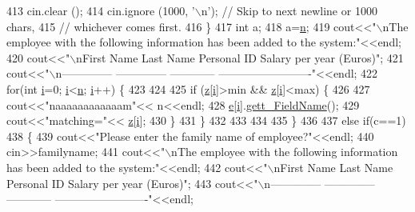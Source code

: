 \begin{DoxyCode}
413         cin.clear ();
414         cin.ignore (1000, \textcolor{charliteral}{'\(\backslash\)n'});  \textcolor{comment}{// Skip to next newline or 1000 chars,}
415         \textcolor{comment}{// whichever comes first.}
416       \}
417       \textcolor{keywordtype}{int} a;
418       a=\hyperlink{HumanResources_8cpp_a76f11d9a0a47b94f72c2d0e77fb32240}{n};
419       cout<<\textcolor{stringliteral}{"\(\backslash\)nThe employee with the following information has been added to the system:"}<<endl;
420       cout<<\textcolor{stringliteral}{"\(\backslash\)nFirst Name       Last Name       Personal ID         Salary per year (Euros)"};
421       cout<<\textcolor{stringliteral}{"\(\backslash\)n--------------   --------------  ------------       -------------------------"}<<endl;
422       \textcolor{keywordflow}{for}(\textcolor{keywordtype}{int} \hyperlink{HumanResources_8cpp_acb559820d9ca11295b4500f179ef6392}{i}=0; \hyperlink{HumanResources_8cpp_acb559820d9ca11295b4500f179ef6392}{i}<\hyperlink{HumanResources_8cpp_a76f11d9a0a47b94f72c2d0e77fb32240}{n}; \hyperlink{HumanResources_8cpp_acb559820d9ca11295b4500f179ef6392}{i}++) \{
423  
424  
425         \textcolor{keywordflow}{if} (\hyperlink{HumanResources_8cpp_a2097171b622749a4748e4da254c3af72}{z}[\hyperlink{HumanResources_8cpp_acb559820d9ca11295b4500f179ef6392}{i}]>min && \hyperlink{HumanResources_8cpp_a2097171b622749a4748e4da254c3af72}{z}[\hyperlink{HumanResources_8cpp_acb559820d9ca11295b4500f179ef6392}{i}]<max) \{
426  
427           cout<<\textcolor{stringliteral}{"naaaaaaaaaaaam"}<< n<<endl;
428           \hyperlink{classHRM_a79ccbda5f455cec5a04d53968f60e6af}{e}[\hyperlink{HumanResources_8cpp_acb559820d9ca11295b4500f179ef6392}{i}].\hyperlink{classPerson_afbebe8ff11b9cf25b6df5eda1df0b447}{gett\_FieldName}();
429           cout<<\textcolor{stringliteral}{"matching="}<< \hyperlink{HumanResources_8cpp_a2097171b622749a4748e4da254c3af72}{z}[\hyperlink{HumanResources_8cpp_acb559820d9ca11295b4500f179ef6392}{i}];
430         \}
431       \}
432  
433  
434  
435     \}
436  
437     \textcolor{keywordflow}{else} \textcolor{keywordflow}{if}(c==1)
438     \{
439       cout<<\textcolor{stringliteral}{"Please enter the family name of employee?"}<<endl;
440       cin>>familyname;
441       cout<<\textcolor{stringliteral}{"\(\backslash\)nThe employee with the following information has been added to the system:"}<<endl;
442       cout<<\textcolor{stringliteral}{"\(\backslash\)nFirst Name       Last Name       Personal ID         Salary per year (Euros)"};
443       cout<<\textcolor{stringliteral}{"\(\backslash\)n--------------   --------------  ------------       -------------------------"}<<endl;

\end{DoxyCode}
